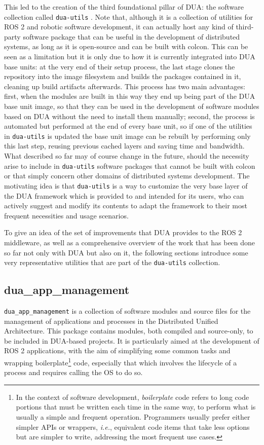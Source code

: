 This led to the creation of the third foundational pillar of DUA: the software collection called \texttt{dua-utils} \cite{masocco_dua-utils_nodate}. Note that, although it is a collection of utilities for ROS 2 and robotic software development, it can actually host any kind of third-party software package that can be useful in the development of distributed systems, as long as it is open-source and can be built with colcon. This can be seen as a limitation but it is only due to how it is currently integrated into DUA base units: at the very end of their setup process, the last stage clones the repository into the image filesystem and builds the packages contained in it, cleaning up build artifacts afterwards. This process has two main advantages: first, when the modules are built in this way they end up being part of the DUA base unit image, so that they can be used in the development of software modules based on DUA without the need to install them manually; second, the process is automated but performed at the end of every base unit, so if one of the utilities in \texttt{dua-utils} is updated the base unit image can be rebuilt by performing only this last step, reusing previous cached layers and saving time and bandwidth. What described so far may of course change in the future, should the necessity arise to include in \texttt{dua-utils} software packages that cannot be built with colcon or that simply concern other domains of distributed systems development. The motivating idea is that \texttt{dua-utils} is a way to customize the very base layer of the DUA framework which is provided to and intended for its users, who can actively suggest and modify its contents to adapt the framework to their most frequent necessities and usage scenarios.

To give an idea of the set of improvements that DUA provides to the ROS 2 middleware, as well as a comprehensive overview of the work that has been done so far not only with DUA but also on it, the following sections introduce some very representative utilities that are part of the \texttt{dua-utils} collection.

\subsection{dua\_app\_management}
\label{sec:dua_app_management}
\texttt{dua\_app\_management} is a collection of software modules and source files for the management of applications and processes in the Distributed Unified Architecture. This package contains modules, both compiled and source-only, to be included in DUA-based projects. It is particularly aimed at the development of ROS 2 applications, with the aim of simplifying some common tasks and wrapping boilerplate\footnote{In the context of software development, \emph{boilerplate} code refers to long code portions that must be written each time in the same way, to perform what is usually a simple and frequent operation. Programmers usually prefer either simpler APIs or wrappers, \emph{i.e.}, equivalent code items that take less options but are simpler to write, addressing the most frequent use cases.} code, especially that which involves the lifecycle of a process and requires calling the OS to do so.

